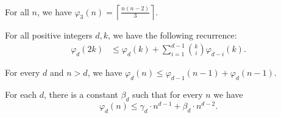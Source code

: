 \documentclass[10pt,a4paper]{amsart}
\begin{document}
\begin{theorem}\label{thm:main3}
For all $n$, we have $\varphi_3(n)=\left\lceil \frac{n(n-2)}{3} \right\rceil$.
\end{theorem}

\begin{lemma}
    For all positive integers $d,k$, we have the following recurrence:
    \begin{align}\label{formula3}
\varphi_d(2k) &\leq \varphi_d(k) + \sum_{i=1}^{d-1}\binom{k}{i}\varphi_{d-i}(k). %
\end{align}
\end{lemma}

\begin{lemma}
\label{recurrence1}
    For every $d$ and $n> d$, we have $\varphi_d(n)\leq \varphi_{d-1}(n-1) + \varphi_d(n-1)$.
\end{lemma}

\begin{theorem}
    For each $d$, there is a constant $\beta_d$ such that for every $n$ we have
    \[ \varphi_d(n) \leq \gamma_d \cdot n^{d-1} +\beta_d \cdot n^{d-2}.
    \]
\end{theorem}
\end{document}
